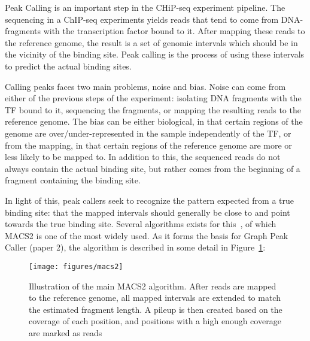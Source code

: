 Peak Calling is an important step in the CHiP-seq experiment pipeline.
The sequencing in a ChIP-seq experiments yields reads that tend to come from DNA-fragments with the transcription factor bound to it. After mapping these reads to the reference genome, the result is a set of genomic intervals which should be in the vicinity of the binding site. Peak calling is the process of using these intervals to predict the actual binding sites. 

Calling peaks faces two main problems, noise and bias. Noise can come from either of the previous steps of the experiment: isolating DNA fragments with the TF bound to it, sequencing the fragments, or mapping the resulting reads to the reference genome. The bias can be either biological, in that certain regions of the genome are over/under-represented in the sample independently of the TF, or from the mapping, in that certain regions of the reference genome are more or less likely to be mapped to. In addition to this, the sequenced reads do not always contain the actual binding site, but rather comes from the beginning of a fragment containing the binding site. 

In light of this, peak callers seek to recognize the pattern expected from a true binding site: that the mapped intervals should generally be close to and point towards the true binding site.
Several algorithms exists for this~\cite{SPP, MACS2, MACS, }, of which MACS2 is one of the most widely used. As it forms the basis for Graph Peak Caller (paper 2), the algorithm is described in some detail in Figure~\ref{fig:macs}:

\begin{figure}
  \texttt{[image: figures/macs2]}
  \caption{Illustration of the main MACS2 algorithm. After reads are mapped to the reference genome, all mapped intervals are extended to match the estimated fragment length. A pileup is then created based on the coverage of each position, and positions with a high enough coverage are marked as reads}
  \label{fig:macs}
\end{figure}

% 
% 
% 
% 
% 
% 
% 
% 
% 
% 
% 
% 
% 
% 
% 
% 
% 
% 
% 
% 
% 
% 
% 
% 
% 
% 
% 
% 
% 
% 
% 
% 
% 
% 
% 
% 
% 
% 
% 
% 
% 
% 
% 
% 
% 
% 
% 
% 
% 
% 
% 
% 
% 
% 
% 
% 
% 
% 
% 
% 
% 
% 
% 
% 
% 
% 
% 
% 
% 
% 
% 
% 
% 
% 
% 
% 
% 
% 
% 
% 
% 
% 
% 
% 
% 
% 
% 
% 
% 
% 
% 
% 
% 
% 
% 
% 
% 
% 
% 
% 
% 
% 
% 
% 
% 
% 
% 
% 
% 
% 
